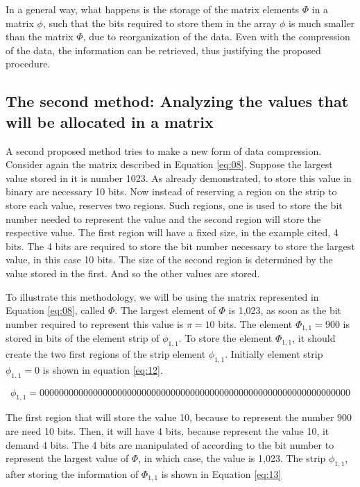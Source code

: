 \documentclass[10pt]{article}
\begin{document}
In a general way, what happens is the storage of the matrix elements $\Phi$ in a matrix $\phi$, such that the bits required to store them in the array $\phi$ is much smaller than the matrix $\Phi$, due to reorganization of the data. Even with the compression of the data, the information can be retrieved, thus justifying the proposed procedure.

\subsection*{The second method: Analyzing the values ​​that will be allocated in a matrix}

A second proposed method tries to make a new form of data compression. Consider again the matrix described in Equation \ref{eq:08}. Suppose the largest value stored in it is number 1023. As already demonstrated, to store this value in binary are necessary 10 bits. Now instead of reserving a region on the strip to store each value, reserves two regions. Such regions, one is used to store the bit number needed to represent the value and the second region will store the respective value. The first region will have a fixed size, in the example cited, 4 bits. The 4 bits are required to store the bit number necessary to store the largest value, in this case 10 bits. The size of the second region is determined by the value stored in the first. And so the other values ​​are stored.

To illustrate this methodology, we will be using the matrix represented in Equation \ref{eq:08}, called $\Phi$. The largest element of $\Phi$ is 1,023, as soon as the bit number required to represent this value is $\pi=10$ bits. The element $\Phi_{1,1}=900$ is stored in bits of the element strip of $\phi_ {1,1}$. To store the element $\Phi_{1,1}$, it should create the two first regions of the strip element $\phi_{1,1} $. Initially element strip $\phi_{1,1}=0$ is shown in equation \ref{eq:12}.

\begin{equation} \label{eq:12}
 \phi_{1,1} = 0000000000000000000000000000000000000000000000000000000000000000
\end{equation}

The first region that will store the value 10, because to represent the number 900 are need 10 bits. Then, it will have 4 bits, because represent the value 10, it demand 4 bits. The 4 bits are manipulated of according to the bit number to represent the largest value of $\Phi$, in which case, the value is 1,023. The strip $\phi_{1,1}$, after storing the information of $\Phi_{1,1}$ is shown in Equation \ref{eq:13}
\end{document}

